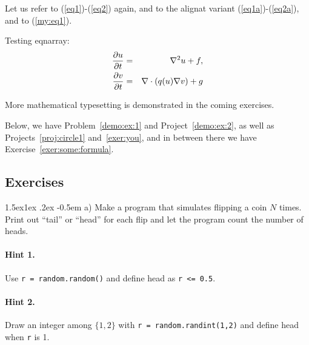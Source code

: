 \documentclass[%
oneside,                 %
final,                   %
10pt]{article}
\makeatletter
\newenvironment{doconceexercise}{}{}
\newcounter{doconceexercisecounter}
\newcommand\subex{\@startsection{paragraph}{4}{\z@}%
                  {1.5ex\@plus1ex \@minus.2ex}%
                  {-0.5em}%
                  {\normalfont\normalsize\bfseries}}
\theoremstyle{definition}
\makeatother
\begin{document}
\begin{enumerate}
Let us refer to (\ref{eq1})-(\ref{eq2}) again, and to the
alignat variant (\ref{eq1a})-(\ref{eq2a}), and to (\ref{my:eq1}).

Testing eqnarray:
\begin{eqnarray}
{\partial u\over\partial t} &=& \nabla^2 u + f, \label{myeq1}\\ 
{\partial v\over\partial t} &=& \nabla\cdot(q(u)\nabla v) + g \label{myeq2}
\end{eqnarray}

More mathematical typesetting is demonstrated in the coming exercises.

Below, we have Problem~\vref{demo:ex:1} and Project~\vref{demo:ex:2},
as well as Projects~\vref{proj:circle1} and~\vref{exer:you}, and in
between there we have Exercise~\vref{exer:some:formula}.

\subsection{Exercises}

\begin{doconceexercise}

                             
\label{demo:ex:1}


\subex{a)}
Make a program that simulates flipping a coin $N$ times.
Print out ``tail'' or ``head'' for each flip and
let the program count the number of heads.


\paragraph{Hint 1.}
Use \texttt{r = random.random()} and define head as \texttt{r <= 0.5}.



\paragraph{Hint 2.}
Draw an integer among $\{1,2\}$ with
\texttt{r = random.randint(1,2)} and define head when \texttt{r} is 1.


\end{doconceexercise}
\end{enumerate}
\end{document}
